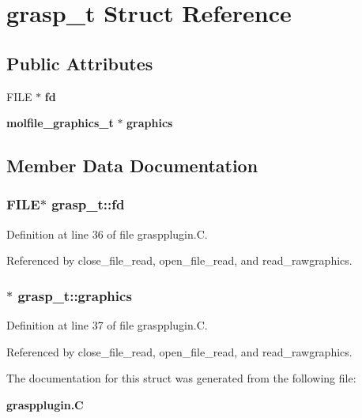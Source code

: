 \section{grasp\_\-t  Struct Reference}
\label{structgrasp__t}
\subsection*{Public Attributes}
\begin{CompactItemize}
\item 
FILE $\ast$ {\bf fd}
\item 
{\bf molfile\_\-graphics\_\-t} $\ast$ {\bf graphics}
\end{CompactItemize}


\subsection{Member Data Documentation}
\subsubsection{\setlength{\rightskip}{0pt plus 5cm}FILE$\ast$ grasp\_\-t::fd}\label{structgrasp__t_m0}




Definition at line 36 of file graspplugin.C.

Referenced by close\_\-file\_\-read, open\_\-file\_\-read, and read\_\-rawgraphics.
\subsubsection{$\ast$ grasp\_\-t::graphics}\label{structgrasp__t_m1}




Definition at line 37 of file graspplugin.C.

Referenced by close\_\-file\_\-read, open\_\-file\_\-read, and read\_\-rawgraphics.

The documentation for this struct was generated from the following file:\begin{CompactItemize}
\item 
{\bf graspplugin.C}\end{CompactItemize}
